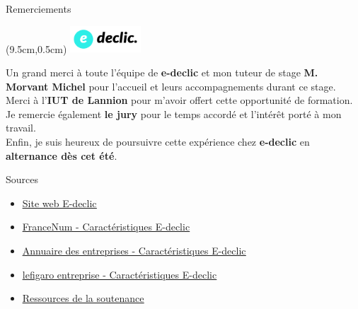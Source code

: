 \documentclass{beamer}
\newcommand{\logoEdeclic}{
	\begin{textblock*}{2cm}(9.5cm,0.5cm)
  		\includegraphics[height=1cm]{../img/logo_e-declic.png}
	\end{textblock*}
}
\begin{document}
\begin{frame}[label=remerciements]{\Large Remerciements}
    \logoEdeclic
    \begin{center}
        \vspace{1em}
        \begin{minipage}{0.9\textwidth}
        		Un grand merci à toute l'équipe de \textbf{e-declic} et mon tuteur de stage \textbf{M. Morvant Michel} pour l'accueil et leurs accompagnements durant ce stage. \vspace{0.25cm} \\
            Merci à l'\textbf{IUT de Lannion} pour m'avoir offert cette opportunité de formation. \vspace{0.25cm} \\
            Je remercie également \textbf{le jury} pour le temps accordé et l'intérêt porté à mon travail. \vspace{0.25cm} \\
            Enfin, je suis heureux de poursuivre cette expérience chez \textbf{e-declic} en \textbf{alternance dès cet été}.
        \end{minipage}
    \end{center}
    \vfill
\end{frame}

\begin{frame}[label=sources]{Sources}
	\begin{itemize}
		\item \href{https://www.e-declic.com/}{\underline{Site web E-declic}}
		\item \href{https://www.francenum.gouv.fr/activateurs/e-declic}{\underline{FranceNum - Caractéristiques E-declic}}
		\item \href{https://annuaire-entreprises.data.gouv.fr/entreprise/e-declic-453413296}{\underline{Annuaire des entreprises - Caractéristiques E-declic}}
		\item \href{https://entreprises.lefigaro.fr/e-declic-56/entreprise-453413296}{\underline{lefigaro entreprise - Caractéristiques E-declic}}
		\item \href{https://github.com/Matteo-K/Soutenance_E-delic/tree/main/img}{\underline{Ressources de la soutenance}}
	\end{itemize}
	\vfill
\end{frame}
\end{document}
